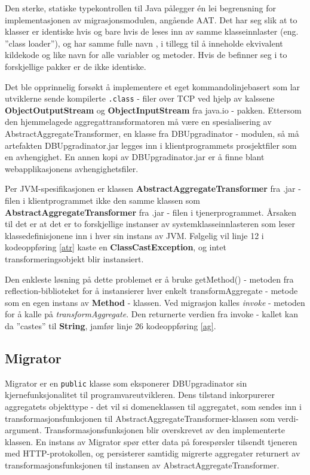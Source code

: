 Den sterke, statiske typekontrollen til Java pålegger én lei begrensning for implementasjonen av migrasjonsmodulen, angående AAT. Det har seg slik at to klasser er identiske hvis og bare hvis de leses inn av samme klasseinnlaster (eng. ''class loader''), og har samme fulle navn \citep{lindholm1999}, i tillegg til å inneholde ekvivalent kildekode og like navn for alle variabler og metoder. Hvis de befinner seg i to forskjellige pakker er de ikke identiske.

Det ble opprinnelig forsøkt å implementere et eget kommandolinjebasert som lar utviklerne sende kompilerte \texttt{.class} - filer over TCP ved hjelp av kalssene \textbf{ObjectOutputStream} og \textbf{ObjectInputStream} fra java.io - pakken. Ettersom den hjemmelagede aggregattransformatoren må være en spesialisering av AbstractAggregateTransformer, en klasse fra DBUpgradinator - modulen, så må artefakten DBUpgradinator.jar legges inn i klientprogrammets prosjektfiler som en avhengighet. En annen kopi av DBUpgradinator.jar er å finne blant webapplikasjonens avhengighetsfiler.

Per JVM-spesifikasjonen er klassen \textbf{AbstractAggregateTransformer} fra .jar - filen i klientprogrammet ikke den samme klassen som \textbf{AbstractAggregateTransformer} fra .jar - filen i tjenerprogrammet. Årsaken til det er at det er to forskjellige instanser av systemklasseinnlasteren som leser klassedefinisjonene inn i hver sin instans av JVM. Følgelig vil linje 12 i kodeoppføring \ref{atr} kaste en \textbf{ClassCastException}, og intet transformeringsobjekt blir instansiert.

Den enkleste løsning på dette problemet er å bruke getMethod() - metoden fra reflection-biblioteket for å instansierer hver enkelt transformAggregate - metode som en egen instans av \textbf{Method} - klassen. Ved migrasjon kalles \emph{invoke} - metoden for å kalle på \emph{transformAggregate}. Den returnerte verdien fra invoke - kallet kan da ''castes'' til \textbf{String}, jamfør linje 26 kodeoppføring \ref{ag}.

\subsection{Migrator}



Migrator er en \texttt{public} klasse som eksponerer DBUpgradinator sin kjernefunksjonalitet til programvareutvikleren. Dens tilstand inkorpurerer aggregatets objekttype - det vil si domeneklassen til aggregatet, som sendes inn i transformasjonsfunksjonen til AbstractAggregateTransformer-klassen som verdi-argument. Transformasjonsfunksjonen blir overskrevet av den implementerte klassen. En instans av Migrator spør etter data på forespørsler tilsendt tjeneren med HTTP-protokollen, og persisterer samtidig migrerte aggregater returnert av transformasjonsfunksjonen til instansen av AbstractAggregateTransformer.

